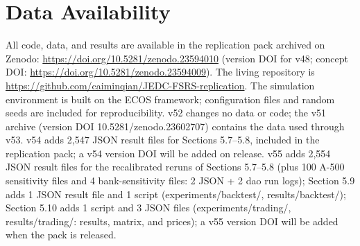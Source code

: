 \documentclass[11pt]{article}
\begin{document}
\section{Data Availability}
All code, data, and results are available in the replication pack archived on Zenodo: \url{https://doi.org/10.5281/zenodo.23594010} (version DOI for v48; concept DOI: \url{https://doi.org/10.5281/zenodo.23594009}). The living repository is \url{https://github.com/caiminqian/JEDC-FSRS-replication}. The simulation environment is built on the ECOS framework; configuration files and random seeds are included for reproducibility. v52 changes no data or code; the v51 archive (version DOI 10.5281/zenodo.23602707) contains the data used through v53. v54 adds 2,547 JSON result files for Sections 5.7--5.8, included in the replication pack; a v54 version DOI will be added on release. v55 adds 2,554 JSON result files for the recalibrated reruns of Sections 5.7--5.8 (plus 100 A-500 sensitivity files and 4 bank-sensitivity files: 2 JSON + 2 dao run logs); Section 5.9 adds 1 JSON result file and 1 script (experiments/backtest/, results/backtest/); Section 5.10 adds 1 script and 3 JSON files (experiments/trading/, results/trading/: results, matrix, and prices); a v55 version DOI will be added when the pack is released.
\end{document}
